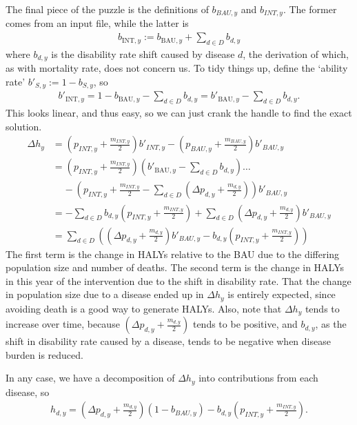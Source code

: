 \documentclass[]{article}
\begin{document}
The final piece of the puzzle is the definitions of $b_{BAU, y}$ and $b_{INT, y}$. The former comes from an input file, while the latter is
\begin{align*}
	b_{\text{INT}, y} := b_{\text{BAU}, y} + \sum_{d \in D} b_{d, y}
\end{align*}
where $b_{d, y}$ is the disability rate shift caused by disease $d$, the derivation of which, as with mortality rate, does not concern us. To tidy things up, define the `ability rate' $b'_{S, y} := 1 - b_{S, y}$, so 
\begin{align*}
	b'_{\text{INT}, y} = 1 -  b_{\text{BAU}, y} - \sum_{d \in D} b_{d, y} = b'_{\text{BAU}, y} - \sum_{d \in D} b_{d, y}.
\end{align*}
This looks linear, and thus easy, so we can just crank the handle to find the exact solution.
\begin{align*}
	\Delta h_y &= \left(p_{INT, y} + \frac{m_{INT, y}}{2}\right)b'_{INT, y} - \left(p_{BAU, y} + \frac{m_{BAU, y}}{2}\right) b'_{BAU, y} \\
	&= \left(p_{INT, y} + \frac{m_{INT, y}}{2}\right) \left(b'_{\text{BAU}, y} - \sum_{d \in D} b_{d, y}\right) \ldots  \\
	&\;\;\;\; - \left(p_{INT, y} + \frac{m_{INT, y}}{2} - \sum_{d \in D} \left(\Delta p_{d, y} + \frac{m_{d, y}}{2}\right)\right)b'_{BAU, y} \\
	&= - \sum_{d \in D} b_{d, y}\left(p_{INT, y} + \frac{m_{INT, y}}{2}\right) + \sum_{d \in D} \left(\Delta p_{d, y} + \frac{m_{d, y}}{2}\right)b'_{BAU, y} \\
	&= \sum_{d \in D} \left(\left(\Delta p_{d, y} + \frac{m_{d, y}}{2}\right)b'_{BAU, y} - b_{d, y}\left(p_{INT, y} + \frac{m_{INT, y}}{2}\right)\right)
\end{align*}
The first term is the change in HALYs relative to the BAU due to the differing population size and number of deaths. The second term is the change in HALYs in this year of the intervention due to the shift in disability rate. That the change in population size due to a disease ended up in $\Delta h_y$ is entirely expected, since avoiding death is a good way to generate HALYs. Also, note that $\Delta h_y$ tends to increase over time, because $\left(\Delta p_{d, y} + \frac{m_{d, y}}{2}\right)$ tends to be positive, and $b_{d, y}$, as the shift in disability rate caused by a disease, tends to be negative when disease burden is reduced.

In any case, we have a decomposition of $\Delta h_y$ into contributions from each disease, so
\begin{align*}
	h_{d, y} = \left(\Delta p_{d, y} + \frac{m_{d, y}}{2}\right)(1 - b_{BAU, y}) - b_{d, y}\left(p_{INT, y} + \frac{m_{INT, y}}{2}\right).
\end{align*}
\end{document}
